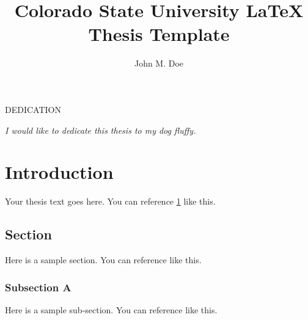 \documentclass[master,dense]{thesis}
\title{Colorado State University \LaTeX{} Thesis Template}
\author{John M. Doe}
\begin{document}

\frontmatter %

\maketitle
\makemycopyright
\makeabstract
\makeacknowledgements
\tableofcontents
\listoftables
\listoffigures

\begin{center}

    DEDICATION

    \vfill %
    \noindent \textit{I would like to dedicate this thesis to my dog fluffy.}
    \vfill
\end{center}
\newpage

\mainmatter %

\chapter{Introduction}
\label{chap:intro} %

Your thesis text goes here.  You can reference \cref{chap:intro} like this.

\section{Section}
\label{sec:intro:section}

Here is a sample section.  You can reference  like this.

\subsection{Subsection A}
\label{sec:intro:section:subsection}

Here is a sample sub-section.  You can reference  like this.
\end{document}
